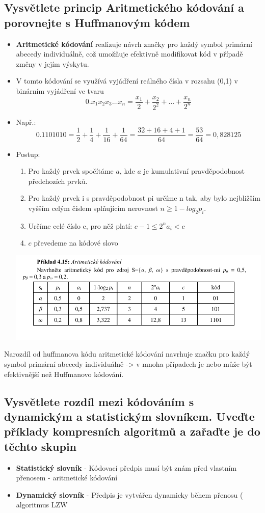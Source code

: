 \subsection{Vysvětlete princip Aritmetického kódování a porovnejte s Huffmanovým kódem}
\begin{itemize}
    \item \textbf{Aritmetické kódování} realizuje návrh značky pro každý symbol primární abecedy individuálně, což umožňuje efektivně modifikovat kód v případě změny v jejím výskytu.
    \item V tomto kódování se využívá vyjádření reálného čísla v rozsahu (0,1) v binárním vyjádření ve tvaru
    $$0.x_1x_2x_3\dots x_n=\frac{x_1}{2}+\frac{x_2}{2^2}+\dots+\frac{x_n}{2^n}$$
    \item Např.:
    $$0.1101010=\frac{1}{2}+\frac{1}{4}+\frac{1}{16}+\frac{1}{64}=\frac{32+16+4+1}{64}=\frac{53}{64}=0,828125$$
    \item Postup:
    \begin{enumerate}
        \item Pro každý prvek spočítáme $a$, kde $a$ je kumulativní pravděpodobnost předchozích prvků.
        \item  Pro každý prvek i s pravděpodobnost pi určíme n tak, aby bylo nejbližším vyšším celým číslem 
        splňujícím nerovnost $n \geq 1 - log_2 p_i$.
        \item Určíme celé číslo c, pro něž platí: $c - 1 \leq 2^n a_i < c $
        \item $c$ převedeme na kódové slovo
    \end{enumerate}
    \includegraphics[width=15.5cm]{images/4_aritmetic.png}
\end{itemize}
Narozdíl od huffmanova kódu aritmetické kódování navrhuje značku pro každý symbol primární abecedy individuálně -> v mnoha případech je nebo může být efektivnější než Huffmanovo kódování.
\subsection{Vysvětlete rozdíl mezi kódováním s dynamickým a statistickým slovníkem. Uveďte příklady kompresních algoritmů a zařaďte je do těchto skupin}
\begin{itemize}
    \item  \textbf{Statistický slovník} - Kódovací předpis musí být znám před vlastním přenosem - aritmetické kódování
    \item \textbf{Dynamický slovník} - Předpis je vytvářen dynamicky během přenosu ( algoritmus LZW
\end{itemize}

